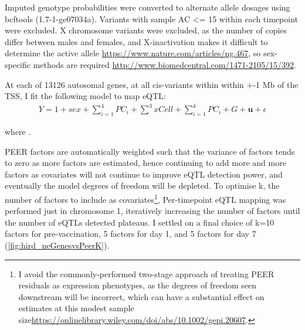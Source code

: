 Imputed genotype probabilities were converted to alternate allele dosages using bcftools (1.7-1-ge07034a).
Variants with sample \gls{AC} <= 15 within each timepoint were excluded.
X chromosome variants were excluded, as the number of copies differ between males and females, and X-inactivation makes it difficult to determine the active allele \url{https://www.nature.com/articles/ng.467},
so sex-specific methods are required \url{http://www.biomedcentral.com/1471-2105/15/392}.

At each of 13126 autosomal genes, at all cis-variants within within +-1 Mb of the \gls{TSS}, I fit the following model to map \gls{eQTL}:
\begin{equation}
\begin{split}
Y = 1 + sex + \sum_{i=1}^{4}{PC_i} + \sum_{}^{3}{xCell} + \sum_{i=1}^{k}{PC_i} + G + \mathbf{u} + \epsilon
\end{split}
\end{equation}

where \todo{}.


PEER factors are automatically weighted such that the variance of factors tends to zero as more factors are estimated, 
hence continuing to add more and more factors as covariates will not continue to improve \gls{eQTL} detection power, and eventually the model degrees of freedom will be depleted.
To optimise k, the number of factors to include as covariates\footnote{I avoid the commonly-performed two-stage approach of treating PEER residuals as expression phenotypes, as the degrees of freedom seen downstream will be incorrect, which can have a substantial effect on estimates at this modest sample size\url{https://onlinelibrary.wiley.com/doi/abs/10.1002/gepi.20607}.}, 
Per-timepoint \gls{eQTL} mapping was performed just in chromosome 1, iteratively increasing the number of factors until the number of \glspl{eQTL} detected plateaus.
I settled on a final choice of k=10 factors for pre-vaccination, 5 factors for day 1, and 5 factors for day 7 (\autoref{fig:hird_neGenesvsPeerK}).

